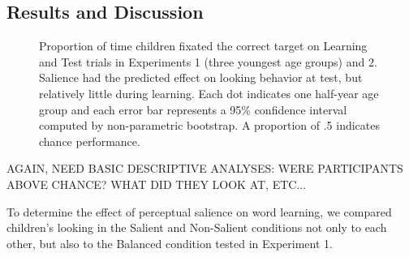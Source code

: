 \documentclass[man,floatsintext]{apa6}
\begin{document}
\subsection{Results and Discussion}

\begin{figure}[!h]
	\caption{\label{fig:exp1_2} Proportion of time children fixated the correct target on Learning and Test trials in Experiments 1 (three youngest age groups) and 2. Salience had the predicted effect on looking behavior at test, but relatively little during learning. Each dot indicates one half-year age group and each error bar represents a 95\% confidence interval computed by non-parametric bootstrap. A proportion of .5 indicates chance performance.}
\end{figure}


AGAIN, NEED BASIC DESCRIPTIVE ANALYSES: WERE PARTICIPANTS ABOVE CHANCE? WHAT DID THEY LOOK AT, ETC...

To determine the effect of perceptual salience on word learning, we compared children's looking in the Salient and Non-Salient conditions not only to each other, but also to the Balanced condition tested in Experiment 1. 
\end{document}
